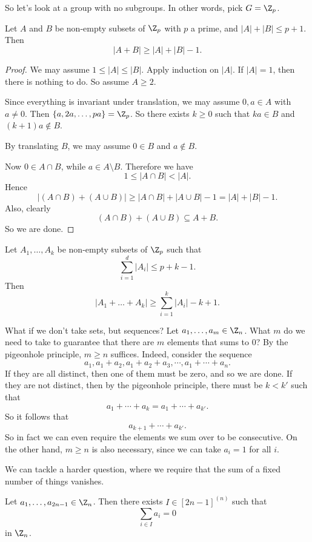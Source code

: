\documentclass[a4paper]{article}
\begin{document}
So let's look at a group with no subgroups. In other words, pick $G = \Z_p$.

\begin{thm}
  Let $A$ and $B$ be non-empty subsets of $\Z_p$ with $p$ a prime, and $|A| + |B| \leq p + 1$. Then
  \[
    |A + B| \geq |A| + |B| - 1.
  \]
\end{thm}

\begin{proof}
  We may assume $1 \leq |A| \leq |B|$. Apply induction on $|A|$. If $|A| = 1$, then there is nothing to do. So assume $A \geq 2$.

  Since everything is invariant under translation, we may assume $0, a \in A$ with $a \not= 0$. Then $\{a, 2a, \ldots, pa\} = \Z_p$. So there exists $k \geq 0$ such that $ka \in B$ and $(k + 1) a \not \in B$.

  By translating $B$, we may assume $0 \in B$ and $a \not \in B$.

  Now $0 \in A \cap B$, while $a \in A \setminus B$. Therefore we have
  \[
    1 \leq |A \cap B| < |A|.
  \]
  Hence
  \[
    |(A \cap B) + (A \cup B)| \geq |A \cap B| + |A \cup B| - 1 = |A| + |B| - 1.
  \]
  Also, clearly
  \[
    (A \cap B) + (A \cup B) \subseteq A + B.
  \]
  So we are done.
\end{proof}

\begin{cor}
  Let $A_1, \ldots, A_k$ be non-empty subsets of $\Z_p$ such that
  \[
    \sum_{i =1 }^d |A_i| \leq p + k - 1.
  \]
  Then
  \[
    |A_1 + \ldots + A_k| \geq \sum_{i = 1}^k |A_i| - k + 1.
  \]
\end{cor}
What if we don't take sets, but sequences? Let $a_1, \ldots, a_m \in \Z_n$. What $m$ do we need to take to guarantee that there are $m$ elements that sums to $0$? By the pigeonhole principle, $m \geq n$ suffices. Indeed, consider the sequence
\[
  a_1, a_1 + a_2, a_1 + a_2 + a_3, \cdots, a_1 + \cdots + a_n.
\]
If they are all distinct, then one of them must be zero, and so we are done. If they are not distinct, then by the pigeonhole principle, there must be $k < k'$ such that
\[
  a_1 + \cdots + a_k = a_1 + \cdots + a_{k'}.
\]
So it follows that
\[
  a_{k + 1} + \cdots + a_{k'}.
\]
So in fact we can even require the elements we sum over to be consecutive. On the other hand, $m \geq n$ is also necessary, since we can take $a_i = 1$ for all $i$.

We can tackle a harder question, where we require that the sum of a fixed number of things vanishes.
\begin{thm}
  Let $a_1, \ldots, a_{2n - 1} \in \Z_n$. Then there exists $I \in [2n - 1]^{(n)}$ such that
  \[
    \sum_{i \in I} a_i = 0
  \]
  in $\Z_n$.
\end{thm}
\end{document}
